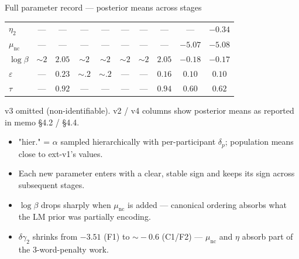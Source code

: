 \documentclass[10pt,aspectratio=169]{beamer}
\newcommand{\emp}[1]{\textcolor{CSP-emphasis}{\textbf{#1}}}
\newcommand{\muted}[1]{\textcolor{CSP-text-light}{#1}}
\begin{document}
\begin{frame}{Full parameter record --- posterior means across stages}
\begin{center}
\begin{tabular}{l cc cc ccccc}
$\eta_2$              & ---   & ---    & ---    & ---    & ---   & ---    & ---    & ---    & $-0.34$ \\
$\mu_\mathrm{nc}$     & ---   & ---    & ---    & ---    & ---   & ---    & ---    & \emp{$-5.07$} & \emp{$-5.08$} \\
\midrule
$\log\beta$           & $\sim 2$ & $2.05$ & $\sim 2$ & $\sim 2$ & $\sim 2$ & $\sim 2$ & $2.05$ & $-0.18$ & $-0.17$ \\
$\varepsilon$         & ---   & $0.23$ & $\sim .2$ & $\sim .2$ & ---      & ---      & $0.16$ & $0.10$ & $0.10$ \\
$\tau$                & ---   & $0.92$ & ---    & ---    & ---   & ---    & $0.94$ & $0.60$ & $0.62$ \\
\bottomrule
\end{tabular}
\end{center}

{\scriptsize \muted{v3 omitted (non-identifiable). v2 / v4 columns show posterior means as reported in memo \S4.2 / \S4.4.}}


\vspace{0.6em}
\scriptsize
\begin{itemize}\itemsep0.1em
  \item \muted{"hier."} = $\alpha$ sampled hierarchically with per-participant $\delta_p$; population means close to ext-v1's values.
  \item Each new parameter enters with a clear, stable sign and keeps its sign across subsequent stages.
  \item $\log\beta$ drops sharply when $\mu_\mathrm{nc}$ is added --- canonical ordering absorbs what the LM prior was partially encoding.
  \item $\delta\gamma_2$ shrinks from $-3.51$ (F1) to $\sim\!-0.6$ (C1/F2) --- $\mu_\mathrm{nc}$ and $\eta$ absorb part of the 3-word-penalty work.
\end{itemize}
\end{frame}
\end{document}
